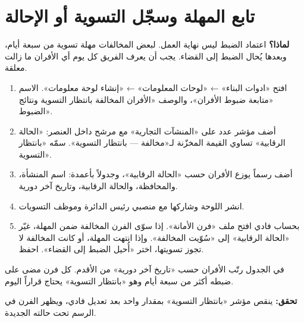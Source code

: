 \section{تابع المهلة وسجّل التسوية أو الإحالة}
\label{sec:real-settle}
\textbf{لماذا؟} اعتماد الضبط ليس نهاية العمل. لبعض المخالفات مهلة تسوية من سبعة أيام، وبعدها يُحال الضبط إلى القضاء. يجب أن يعرف الفريق كل يوم أي الأفران ما زالت معلقة.
\begin{enumerate}
\item افتح «ادوات البناء» ← «لوحات المعلومات» ← «إنشاء لوحة معلومات». الاسم «متابعة ضبوط الأفران»، والوصف «الأفران المخالفة بانتظار التسوية ونتائج الضبوط».
\item أضف مؤشر عدد على «المنشآت التجارية» مع مرشح داخل العنصر: «الحالة الرقابية» تساوي القيمة المخزّنة لـ«مخالفة — بانتظار التسوية». سمّه «بانتظار التسوية».
\item أضف رسماً يوزع الأفران حسب «الحالة الرقابية»، وجدولاً بأعمدة: اسم المنشأة، والمحافظة، والحالة الرقابية، وتاريخ آخر دورية.
\item انشر اللوحة وشاركها مع منصبي رئيس الدائرة وموظف التسويات.
\item بحساب فادي افتح ملف «فرن الأمانة». إذا سوّى الفرن المخالفة ضمن المهلة، غيّر «الحالة الرقابية» إلى «سُوّيت المخالفة». وإذا انتهت المهلة، أو كانت المخالفة لا تجوز تسويتها، اختر «أُحيل الضبط إلى القضاء». احفظ.
\end{enumerate}
\begin{rcnote}
في الجدول رتّب الأفران حسب «تاريخ آخر دورية» من الأقدم. كل فرن مضى على ضبطه أكثر من سبعة أيام وهو «بانتظار التسوية» يحتاج قراراً اليوم.
\end{rcnote}
\textbf{تحقق:} ينقص مؤشر «بانتظار التسوية» بمقدار واحد بعد تعديل فادي، ويظهر الفرن في الرسم تحت حالته الجديدة.

